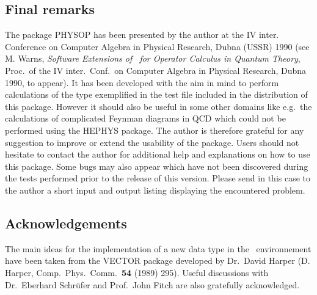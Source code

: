 \subsection{Final remarks}
The package PHYSOP has been presented by
the author at the IV inter. Conference on Computer Algebra in Physical
Research, Dubna (USSR) 1990 (see M. Warns, {\it
Software Extensions of \REDUCE\ for Operator Calculus in Quantum Theory},
Proc.\ of the IV inter.\ Conf.\ on Computer Algebra in Physical
Research, Dubna 1990, to appear). It has been developed with the aim in
mind to perform calculations of the type exemplified in the test file
included in the distribution of this package.
However it should
also be useful in some other domains like e.g.\ the calculations of
complicated Feynman diagrams in QCD  which could not be  performed using
the HEPHYS package. The author is  therefore grateful for any
suggestion
to improve or extend the usability of the package. Users should not
hesitate to contact the author for additional help and explanations on
how to use
this package. Some bugs may also
appear which have not been discovered during the tests performed
prior to the release of this version. Please send in this case to the
author  a short
input and output listing  displaying the encountered problem.

\subsection*{Acknowledgements}
The main ideas for the implementation of a new data type in the \REDUCE\
environnement have been taken from the VECTOR package developed by
Dr.\ David Harper (D. Harper, Comp.\ Phys.\ Comm.\ {\bf 54} (1989)
295).
Useful discussions with  Dr.\ Eberhard Schr\"ufer  and
Prof.\ John Fitch are also gratefully acknowledged.


